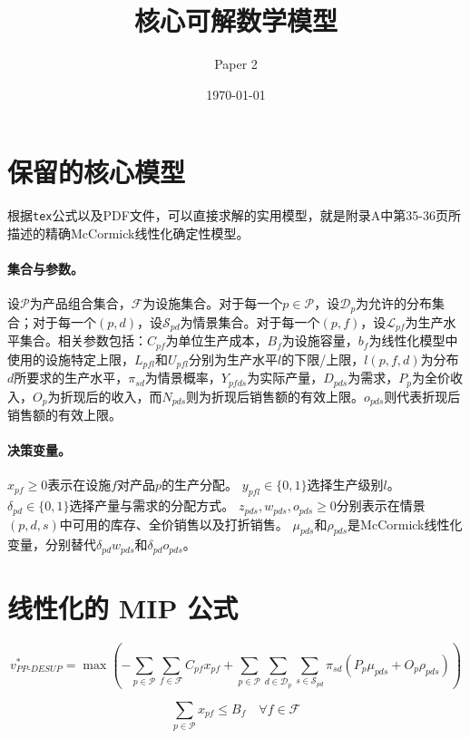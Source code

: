 \documentclass{article}
\title{核心可解数学模型}
\author{Paper 2}
\date{\today}
\begin{document}
\maketitle

\section*{保留的核心模型}
根据\texttt{tex}公式以及PDF文件，可以直接求解的实用模型，就是附录A中第35-36页所描述的精确McCormick线性化确定性模型。 

\paragraph{集合与参数。}
设$\mathcal{P}$为产品组合集合，$\mathcal{F}$为设施集合。对于每一个$p \in \mathcal{P}$，设$\mathcal{D}_p$为允许的分布集合；对于每一个$(p,d)$，设$\mathcal{S}_{pd}$为情景集合。对于每一个$(p,f)$，设$\mathcal{L}_{pf}$为生产水平集合。相关参数包括：$C_{pf}$为单位生产成本，$B_f$为设施容量，$b_f$为线性化模型中使用的设施特定上限，$L_{pfl}$和$U_{pfl}$分别为生产水平$l$的下限/上限，$l(p,f,d)$为分布$d$所要求的生产水平，$\pi_{sd}$为情景概率，$Y_{pfds}$为实际产量，$D_{pds}$为需求，$P_p$为全价收入，$O_p$为折现后的收入，而$N_{pds}$则为折现后销售额的有效上限。$o_{pds}$则代表折现后销售额的有效上限。

\paragraph{决策变量。}
$x_{pf} \ge 0$表示在设施$f$对产品$p$的生产分配。  
$y_{pfl}\in\{0,1\}$选择生产级别$l$。  
$\delta_{pd}\in\{0,1\}$选择产量与需求的分配方式。  
$z_{pds}, w_{pds}, o_{pds} \ge 0$分别表示在情景$(p,d,s)$中可用的库存、全价销售以及打折销售。  
$\mu_{pds}$和$\rho_{pds}$是McCormick线性化变量，分别替代$\delta_{pd} w_{pds}$和$\delta_{pd} o_{pds}$。

\section*{线性化的 MIP 公式}
\begin{equation}
v_{PP\text{-}DESUP}^{*}
= \max
\left(
- \sum_{p \in \mathcal{P}} \sum_{f \in \mathcal{F}} C_{pf} x_{pf}
+ \sum_{p \in \mathcal{P}} \sum_{d \in \mathcal{D}_p} \sum_{s \in \mathcal{S}_{pd}}
\pi_{sd}\left( P_p \mu_{pds} + O_p \rho_{pds} \right)
\right)
\tag{22a}
\end{equation}

\begin{equation}
\sum_{p \in \mathcal{P}} x_{pf} \le B_f
\quad \forall f \in \mathcal{F}
\tag{22b}
\end{equation}
\end{document}
